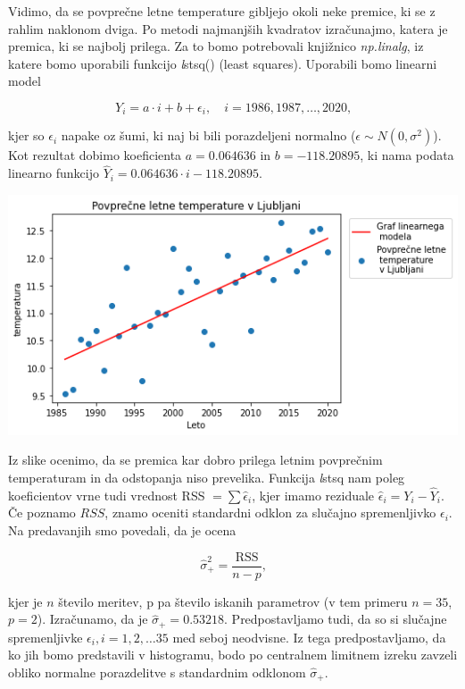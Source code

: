 \documentclass[12pt, a4paper]{article}
\begin{document}
Vidimo, da se povprečne letne temperature gibljejo okoli neke premice, ki se 
z rahlim naklonom dviga. Po metodi najmanjših kvadratov izračunajmo, katera je 
premica, ki se najbolj prilega. Za to bomo potrebovali knjižnico \emph{np.linalg},
iz katere bomo uporabili funkcijo \emph lstsq() (least squares). Uporabili 
bomo linearni model

$$ Y_i = a \cdot i + b + \epsilon_i, \quad i = 1986, 1987, \dots, 2020 \text{,}
$$

kjer so $\epsilon_i$ napake oz šumi, ki naj bi bili porazdeljeni normalno 
($\epsilon \sim N(0, \sigma^2)$). Kot rezultat dobimo koeficienta 
$a = 0.064636$ in $b = -118.20895$, ki nama podata linearno funkcijo 
$\hat{Y}_i = 0.064636 \cdot i - 118.20895$. 

\begin{center}
    \includegraphics[scale=0.7]{Naloga_3_03}
\end{center}

Iz slike ocenimo, da se premica kar dobro prilega letnim povprečnim temperaturam 
in da odstopanja niso prevelika. Funkcija \emph lstsq nam poleg koeficientov vrne
tudi vrednost RSS $= \sum \hat{\epsilon}_i$, kjer imamo reziduale $\hat{\epsilon}_i
 = Y_i - \hat{Y}_i$. Če poznamo $RSS$, znamo oceniti standardni odklon za slučajno
 spremenljivko $\epsilon_i$. Na predavanjih smo povedali, da je ocena 
 
$$ \hat{\sigma}^2_+ = \frac{\text{RSS}}{n-p} \text{,}
$$

kjer je $n$ število meritev, p pa število iskanih parametrov (v tem primeru $n = 35$,
$p=2$). Izračunamo, da je $\hat{\sigma}_+ = 0.53218$. Predpostavljamo tudi, da so si
slučajne spremenljivke $\epsilon_i, i = 1, 2, \dots 35$ med seboj neodvisne. Iz tega 
predpostavljamo, da ko jih bomo predstavili v histogramu, bodo po centralnem limitnem 
izreku zavzeli obliko normalne porazdelitve s standardnim odklonom $\hat{\sigma}_+$.
\end{document}
